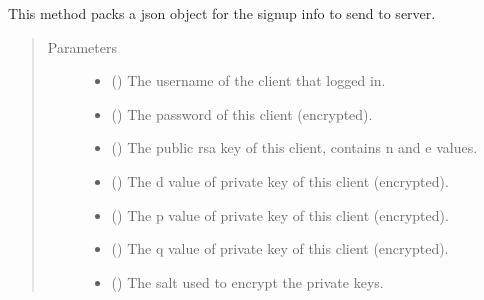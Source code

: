 \documentclass[letterpaper,10pt,english]{sphinxmanual}
\begin{document}
\begin{fulllineitems}
\begin{fulllineitems}
\end{fulllineitems}


\begin{fulllineitems}
\label{\detokenize{clientHelper:clientHelper.Client.packJSONsignup}}
This method packs a json object for the signup info to send to server.
\begin{quote}\begin{description}
\item[{Parameters}] \leavevmode\begin{itemize}
\item {} 
 () \textendash{} The username of the client that logged in.

\item {} 
 () \textendash{} The password of this client (encrypted).

\item {} 
 () \textendash{} The public rsa key of this client, contains n and e values.

\item {} 
 () \textendash{} The d value of private key of this client (encrypted).

\item {} 
 () \textendash{} The p value of private key of this client (encrypted).

\item {} 
 () \textendash{} The q value of private key of this client (encrypted).

\item {} 
 () \textendash{} The salt used to encrypt the private keys.


\end{itemize}
\end{description}
\end{quote}
\end{fulllineitems}
\end{fulllineitems}
\end{document}
